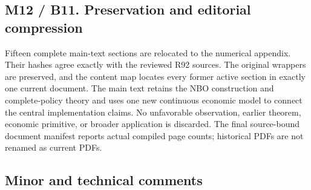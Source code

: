 \hypertarget{m12-b11.-preservation-and-editorial-compression}{%
\subsection{M12 / B11. Preservation and editorial
compression}\label{m12-b11.-preservation-and-editorial-compression}}

Fifteen complete main-text sections are relocated to the numerical
appendix. Their hashes agree exactly with the reviewed R92 sources. The
original wrappers are preserved, and the content map locates every
former active section in exactly one current document. The main text
retains the NBO construction and complete-policy theory and uses one new
continuous economic model to connect the central implementation claims.
No unfavorable observation, earlier theorem, economic primitive, or
broader application is discarded. The final source-bound document
manifest reports actual compiled page counts; historical PDFs are not
renamed as current PDFs.

\hypertarget{minor-and-technical-comments}{%
\subsection{Minor and technical
comments}\label{minor-and-technical-comments}}

